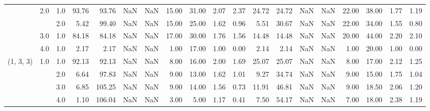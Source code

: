 \begin{tabular}{lllrrrrrrrrrrrrrrrr}
          & 2.0 & 1.0  &     93.76 &      93.76 &               NaN &                NaN & 15.00 &  31.00 &             2.07 &                         2.37 &     24.72 &      24.72 &               NaN &                NaN & 22.00 &  38.00 &             1.77 &                         1.19 \\
          &     & 2.0  &      5.42 &      99.40 &               NaN &                NaN & 15.00 &  25.00 &             1.62 &                         0.96 &      5.51 &      30.67 &               NaN &                NaN & 22.00 &  34.00 &             1.55 &                         0.80 \\
          & 3.0 & 1.0  &     84.18 &      84.18 &               NaN &                NaN & 17.00 &  30.00 &             1.76 &                         1.56 &     14.48 &      14.48 &               NaN &                NaN & 20.00 &  44.00 &             2.20 &                         2.10 \\
          & 4.0 & 1.0  &      2.17 &       2.17 &               NaN &                NaN &  1.00 &  17.00 &             1.00 &                         0.00 &      2.14 &       2.14 &               NaN &                NaN &  1.00 &  20.00 &             1.00 &                         0.00 \\
(1, 3, 3) & 1.0 & 1.0  &     92.13 &      92.13 &               NaN &                NaN &  8.00 &  16.00 &             2.00 &                         1.69 &     25.07 &      25.07 &               NaN &                NaN &  8.00 &  17.00 &             2.12 &                         1.25 \\
          &     & 2.0  &      6.64 &      97.83 &               NaN &                NaN &  9.00 &  13.00 &             1.62 &                         1.01 &      9.27 &      34.74 &               NaN &                NaN &  9.00 &  15.00 &             1.75 &                         1.04 \\
          &     & 3.0  &      6.85 &     105.25 &               NaN &                NaN &  9.00 &  14.00 &             1.56 &                         0.73 &     11.91 &      46.81 &               NaN &                NaN &  9.00 &  18.50 &             2.06 &                         1.20 \\
          &     & 4.0  &      1.10 &     106.04 &               NaN &                NaN &  3.00 &   5.00 &             1.17 &                         0.41 &      7.50 &      54.17 &               NaN &                NaN &  7.00 &  18.00 &             2.38 &                         1.19 \\

\end{tabular}
